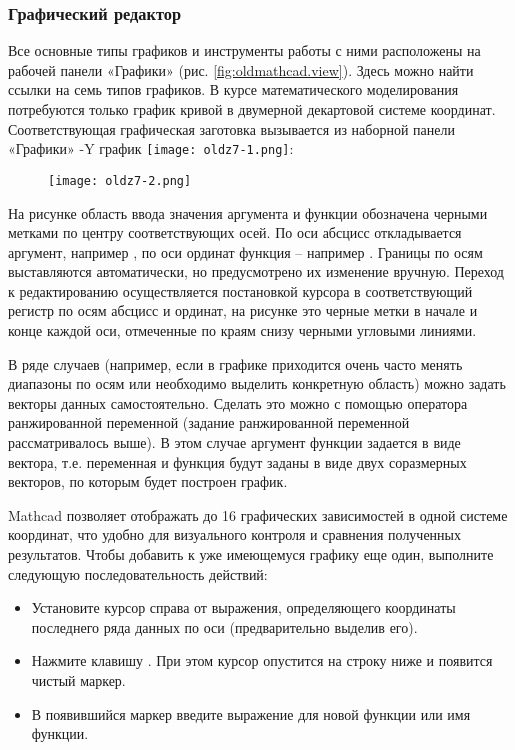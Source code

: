 \subsubsection{Графический редактор}
Все основные типы графиков и инструменты работы с ними расположены на рабочей панели «Графики» (рис. \ref{fig:oldmathcad.view}). Здесь можно найти ссылки на семь типов графиков. В курсе математического моделирования потребуются только график кривой в двумерной декартовой системе координат. Соответствующая графическая заготовка вызывается из наборной панели «Графики» -Y график 
\texttt{[image: oldz7-1.png]}:
\begin{figure}[h]
	\begin{center}
		\texttt{[image: oldz7-2.png]}
	\end{center}
\end{figure}

На рисунке область ввода значения аргумента и функции обозначена черными метками по центру соответствующих осей. По оси абсцисс откладывается аргумент, например , по оси ординат функция -- например . Границы по осям выставляются автоматически, но предусмотрено их изменение вручную. Переход к редактированию осуществляется постановкой курсора в соответствующий регистр по осям абсцисс и ординат, на рисунке это черные метки в начале и конце каждой оси, отмеченные по краям снизу черными угловыми линиями.

В ряде случаев (например, если в графике приходится очень часто менять диапазоны по осям или необходимо выделить конкретную область) можно задать векторы данных самостоятельно. Сделать это можно с помощью оператора ранжированной переменной (задание ранжированной переменной рассматривалось выше). В этом случае аргумент функции задается в виде вектора, т.е. переменная и функция будут заданы в виде двух соразмерных векторов, по которым будет построен график.

Mathcad позволяет отображать до 16 графических зависимостей в одной системе координат, что удобно для визуального контроля и сравнения полученных результатов. Чтобы добавить к уже имеющемуся графику еще один, выполните следующую последовательность действий:
\begin{itemize}
	\item Установите курсор справа от выражения, определяющего координаты последнего ряда данных по оси  (предварительно выделив его).
	\item Нажмите клавишу \keys{,}. При этом курсор опустится на строку ниже и появится чистый маркер.
	\item В появившийся маркер введите выражение для новой функции или имя функции.
\end{itemize}

